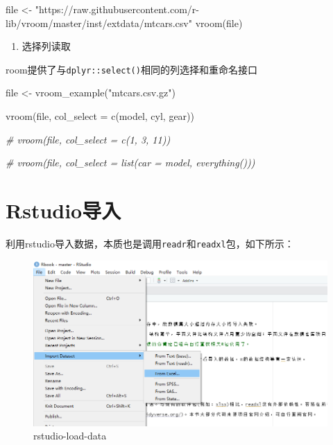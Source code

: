 \documentclass[
]{book}
\newenvironment{Shaded}{\begin{snugshade}}{\end{snugshade}}
\newcommand{\AttributeTok}[1]{\textcolor[rgb]{0.77,0.63,0.00}{#1}}
\newcommand{\CommentTok}[1]{\textcolor[rgb]{0.56,0.35,0.01}{\textit{#1}}}
\newcommand{\FunctionTok}[1]{\textcolor[rgb]{0.00,0.00,0.00}{#1}}
\newcommand{\NormalTok}[1]{#1}
\newcommand{\OtherTok}[1]{\textcolor[rgb]{0.56,0.35,0.01}{#1}}
\newcommand{\StringTok}[1]{\textcolor[rgb]{0.31,0.60,0.02}{#1}}
\providecommand{\tightlist}{%
  \setlength{\itemsep}{0pt}\setlength{\parskip}{0pt}}
\begin{document}
\begin{Shaded}
\begin{Highlighting}[]
\NormalTok{file }\OtherTok{\textless{}{-}} \StringTok{"https://raw.githubusercontent.com/r{-}lib/vroom/master/inst/extdata/mtcars.csv"}
\FunctionTok{vroom}\NormalTok{(file)}
\end{Highlighting}
\end{Shaded}

\begin{enumerate}
\def\labelenumi{\arabic{enumi}.}
\setcounter{enumi}{4}
\tightlist
\item
  选择列读取
\end{enumerate}

room提供了与\texttt{dplyr::select()}相同的列选择和重命名接口

\begin{Shaded}
\begin{Highlighting}[]
\NormalTok{file }\OtherTok{\textless{}{-}} \FunctionTok{vroom\_example}\NormalTok{(}\StringTok{"mtcars.csv.gz"}\NormalTok{)}

\FunctionTok{vroom}\NormalTok{(file, }\AttributeTok{col\_select =} \FunctionTok{c}\NormalTok{(model, cyl, gear))}

\CommentTok{\# vroom(file, col\_select = c(1, 3, 11))}

\CommentTok{\# vroom(file, col\_select = list(car = model, everything()))}
\end{Highlighting}
\end{Shaded}

\hypertarget{data:rstudio-addins}{%
\section{Rstudio导入}\label{data:rstudio-addins}}

利用rstudio导入数据，本质也是调用\texttt{readr}和\texttt{readxl}包，如下所示：

\begin{figure}
\centering
\includegraphics{picture/read-write/Rstudio-load-data.png}
\caption{rstudio-load-data}
\end{figure}
\end{document}
